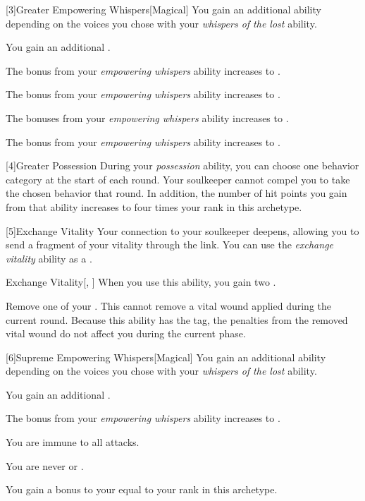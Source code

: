         [3]{Greater Empowering Whispers}[Magical] You gain an additional ability depending on the voices you chose with your \textit{whispers of the lost} ability.
        {
             You gain an additional .

             The bonus from your \textit{empowering whispers} ability increases to .

             The bonus from your \textit{empowering whispers} ability increases to .

             The bonuses from your \textit{empowering whispers} ability increases to .

             The bonus from your \textit{empowering whispers} ability increases to .
        }

        [4]{Greater Possession} During your \textit{possession} ability, you can choose one behavior category at the start of each round.
        Your soulkeeper cannot compel you to take the chosen behavior that round.
        In addition, the number of hit points you gain from that ability increases to four times your rank in this archetype.

        [5]{Exchange Vitality} Your connection to your soulkeeper deepens, allowing you to send a fragment of your vitality through the link.
        You can use the \textit{exchange vitality} ability as a .
        \begin{freeability}{Exchange Vitality}[, ]
            When you use this ability, you gain two .

            Remove one of your .
            This cannot remove a vital wound applied during the current round.
            Because this ability has the  tag, the penalties from the removed vital wound do not affect you during the current phase.
        \end{freeability}

        [6]{Supreme Empowering Whispers}[Magical] You gain an additional ability depending on the voices you chose with your \textit{whispers of the lost} ability.
        {
             You gain an additional .

             The bonus from your \textit{empowering whispers} ability increases to .

             You are immune to all  attacks.

             You are never  or .

             You gain a bonus to your  equal to your rank in this archetype.
        }

